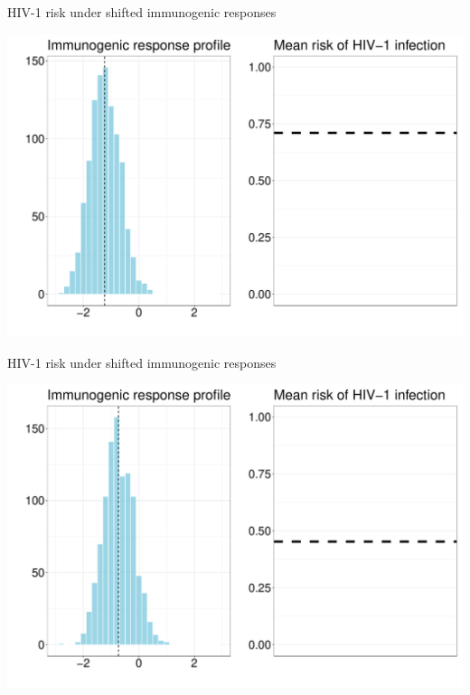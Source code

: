 \documentclass{beamer}
\begin{document}

\begin{frame}[c,noframenumbering]{HIV-1 risk under shifted immunogenic responses}

\hspace*{-1cm}\includegraphics[scale=0.4]{shift-3}

\note{
}

\end{frame}


\begin{frame}[c,noframenumbering]{HIV-1 risk under shifted immunogenic responses}

\hspace*{-1cm}\includegraphics[scale=0.4]{shift-4}

\note{
}

\end{frame}
\end{document}
